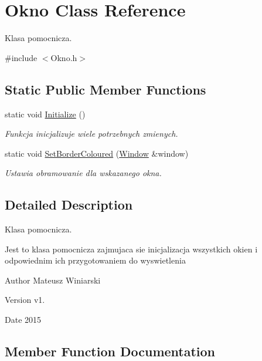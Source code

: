 \hypertarget{class_okno}{}\section{Okno Class Reference}
\label{class_okno}


Klasa pomocnicza.  




{\ttfamily \#include $<$Okno.\+h$>$}

\subsection*{Static Public Member Functions}
\begin{DoxyCompactItemize}
\item 
static void \hyperlink{class_okno_a48a5b9af8dbf76e60be2e5d464f62d1e}{Initialize} ()
\begin{DoxyCompactList}\small\item\em Funkcja inicjalizuje wiele potrzebnych zmienych. \end{DoxyCompactList}\item 
static void \hyperlink{class_okno_a3ec5330f3b091006670cac8e2b12442e}{Set\+Border\+Coloured} (\hyperlink{class_window}{Window} \&window)
\begin{DoxyCompactList}\small\item\em Ustawia obramowanie dla wskazanego okna. \end{DoxyCompactList}\end{DoxyCompactItemize}


\subsection{Detailed Description}
Klasa pomocnicza. 

Jest to klasa pomocnicza zajmujaca sie inicjalizacja wszystkich okien i odpowiednim ich przygotowaniem do wyswietlenia \begin{DoxyAuthor}{Author}
Mateusz Winiarski 
\end{DoxyAuthor}
\begin{DoxyVersion}{Version}
v1. 
\end{DoxyVersion}
\begin{DoxyDate}{Date}
2015 
\end{DoxyDate}


\subsection{Member Function Documentation}
\hypertarget{class_okno_a48a5b9af8dbf76e60be2e5d464f62d1e}{}
